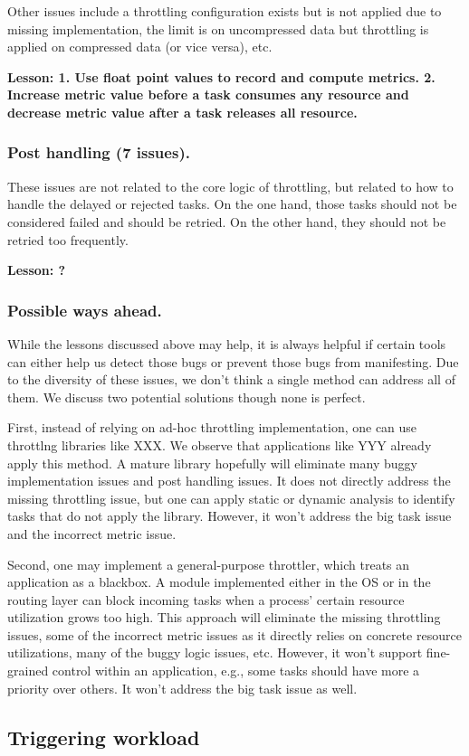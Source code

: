 Other issues include a throttling configuration exists but is not applied due to missing implementation,
the limit is on uncompressed data but throttling is applied on compressed data (or vice versa), etc.

\noindent
\textbf{Lesson: 1. Use float point values to record and compute metrics.
 2. Increase metric value before a task consumes any resource and decrease
metric value after a task releases all resource.}

\subsubsection{Post handling (7 issues).} These issues are not related to the core logic of throttling, but related
to how to handle the delayed or rejected tasks. On the one hand, those tasks should not be considered
failed and should be retried. On the other hand, they should not be retried too frequently.

\noindent
\textbf{Lesson: ?}

\subsubsection{Possible ways ahead.} While the lessons discussed above may help, it is always helpful
if certain tools can either help us detect those bugs or prevent those bugs from manifesting. Due to the
diversity of these issues, we don't think a single method can address all of them. We discuss two potential
solutions though none is perfect.

First, instead of relying on ad-hoc throttling implementation, one can use throttlng libraries like XXX.
We observe that applications like YYY already apply this method. A mature library hopefully will eliminate
many buggy implementation issues and post handling issues. It does not directly address the missing throttling
issue, but one can apply static or dynamic analysis to identify tasks that do not apply the library. However,
it won't address the big task issue and the incorrect metric issue.

Second, one may implement a general-purpose throttler, which treats an application as a blackbox.
A module implemented either in the OS or in the routing layer can block incoming tasks when a process'
certain resource utilization grows too high. This approach will eliminate the missing throttling issues,
some of the incorrect metric issues as it directly relies on concrete resource utilizations, many of the
buggy logic issues, etc. However, it won't support fine-grained control within an application, e.g., some
tasks should have more a priority over others. It won't address the big task issue as well.


\subsection{Triggering workload}
